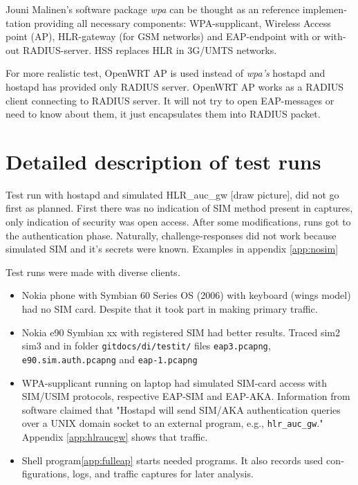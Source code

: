 \documentclass[12pt,a4paper,english]{tutthesis}
\begin{document}
\begin{otherlanguage}{english}
Jouni Malinen's software package \emph{wpa} can be thought as an reference
implementation providing all necessary components: WPA-supplicant, Wireless
Access point (AP), HLR-gateway (for GSM networks) and EAP-endpoint with
or without RADIUS-server. HSS replaces HLR in 3G/UMTS networks.

For more realistic test, OpenWRT AP is used instead of \emph{wpa's} hostapd
and hostapd has provided only RADIUS server.
OpenWRT AP works as a RADIUS client connecting to RADIUS server. 
It will not try to open EAP-messages or need
to know about them, it just encapsulates them into RADIUS packet.

\section{Detailed description of test runs}
\label{sec-5-2}



Test run with hostapd and simulated HLR\_auc\_gw [draw picture], did
not go first as planned. First there was no indication of SIM method
present in captures, only indication of security was open access.
After some modifications, runs got to the authentication phase.
Naturally, challenge-responses did not work 
because simulated SIM and it's secrets were known. 
Examples in appendix \ref{app:nosim}   



Test runs were made with diverse clients.
\begin{itemize}
\item Nokia phone with Symbian 60 Series OS (2006) with keyboard
(wings model) had no SIM card. Despite that it took part in making
primary traffic.
\item Nokia e90 Symbian xx with registered SIM had better results. Traced
sim2 sim3 and in folder \verb~gitdocs/di/testit/~ files \verb~eap3.pcapng~,
\verb~e90.sim.auth.pcapng~ and \verb~eap-1.pcapng~
\item WPA-supplicant running on laptop had simulated SIM-card access
with SIM/USIM protocols, respective EAP-SIM and EAP-AKA.  
Information from software claimed that "Hostapd
will send SIM/AKA authentication queries over a UNIX domain socket
to an external program, e.g., \verb~hlr_auc_gw~." Appendix \ref{app:hlraucgw}
shows that traffic.
\end{itemize}
\begin{itemize}
\item Shell program\ref{app:fulleap} starts needed programs. It also records used configurations,
logs, and traffic captures for later analysis.
\end{itemize}


\end{otherlanguage}
\end{document}
